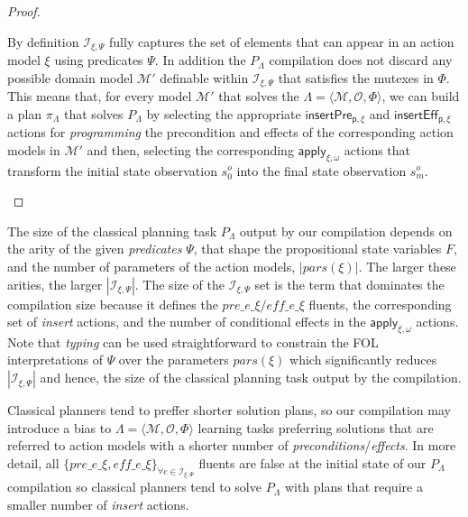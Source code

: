 \documentclass{article}
\newcommand{\tup}[1]{{\langle #1 \rangle}}
\begin{document}
\begin{proof}[Proof]
\begin{small}
By definition ${\mathcal I}_{\xi,\Psi}$ fully captures the set of elements that can appear in an action model $\xi$ using predicates $\Psi$. In addition the $P_{\Lambda}$ compilation does not discard any possible domain model $\mathcal{M}'$ definable within ${\mathcal I}_{\xi,\Psi}$ that satisfies the mutexes in $\Phi$. This means that, for every model $\mathcal{M}'$ that solves the $\Lambda=\tup{\mathcal{M},{\mathcal O},\Phi}$, we can build a plan $\pi_{\Lambda}$ that solves $P_{\Lambda}$ by selecting the appropriate $\mathsf{insertPre_{p,\xi}}$ and $\mathsf{insertEff_{p,\xi}}$ actions for {\em programming} the precondition and effects of the corresponding action models in $\mathcal{M}'$ and then, selecting the corresponding $\mathsf{apply_{\xi,\omega}}$ actions that transform the initial state observation $s_0^o$ into the final state observation $s_m^o$.
\end{small}
\end{proof}

The size of the classical planning task $P_{\Lambda}$ output by our compilation depends on the arity of the given {\em predicates} $\Psi$, that shape the propositional state variables $F$, and the number of parameters of the action models, $|pars(\xi)|$. The larger these arities, the larger $|{\mathcal I}_{\xi,\Psi}|$. The size of the ${\mathcal I}_{\xi,\Psi}$ set is the term that dominates the compilation size because it defines the $pre\_e\_\xi/eff\_e\_\xi$ fluents, the corresponding set of {\em insert} actions, and the number of conditional effects in the $\mathsf{apply_{\xi,\omega}}$ actions. Note that {\em typing} can be used straightforward to constrain the FOL interpretations of $\Psi$ over the parameters $pars(\xi)$ which significantly reduces $|{\mathcal I}_{\xi,\Psi}|$ and hence, the size of the classical planning task output by the compilation.

Classical planners tend to preffer shorter solution plans, so our compilation may introduce a bias to $\Lambda=\tup{\mathcal{M},{\mathcal O},\Phi}$ learning tasks preferring solutions that are referred to action models with a shorter number of {\em preconditions}/{\em effects}. In more detail, all $\{pre\_e\_\xi, eff\_e\_\xi\}_{\forall e\in{\mathcal I}_{\xi,\Psi}}$ fluents are false at the initial state of our $P_\Lambda$ compilation so classical planners tend to solve $P_\Lambda$ with plans that require a smaller number of {\em insert} actions.
\end{document}
